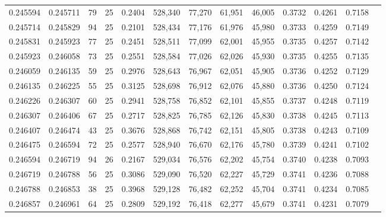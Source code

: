 \begin{tabular}{rrrrrrrrrrrrr}
0.245594 & 0.245711 &    79 &  25 &                                     0.2404 & 528,340 &  77,270 &  61,951 &  46,005 & 0.3732 & 0.4261 & 0.7158 \\
0.245714 & 0.245829 &    94 &  25 &                                     0.2101 & 528,434 &  77,176 &  61,976 &  45,980 & 0.3733 & 0.4259 & 0.7149 \\
0.245831 & 0.245923 &    77 &  25 &                                     0.2451 & 528,511 &  77,099 &  62,001 &  45,955 & 0.3735 & 0.4257 & 0.7142 \\
0.245923 & 0.246058 &    73 &  25 &                                     0.2551 & 528,584 &  77,026 &  62,026 &  45,930 & 0.3735 & 0.4255 & 0.7135 \\
0.246059 & 0.246135 &    59 &  25 &                                     0.2976 & 528,643 &  76,967 &  62,051 &  45,905 & 0.3736 & 0.4252 & 0.7129 \\
0.246135 & 0.246225 &    55 &  25 &                                     0.3125 & 528,698 &  76,912 &  62,076 &  45,880 & 0.3736 & 0.4250 & 0.7124 \\
0.246226 & 0.246307 &    60 &  25 &                                     0.2941 & 528,758 &  76,852 &  62,101 &  45,855 & 0.3737 & 0.4248 & 0.7119 \\
0.246307 & 0.246406 &    67 &  25 &                                     0.2717 & 528,825 &  76,785 &  62,126 &  45,830 & 0.3738 & 0.4245 & 0.7113 \\
0.246407 & 0.246474 &    43 &  25 &                                     0.3676 & 528,868 &  76,742 &  62,151 &  45,805 & 0.3738 & 0.4243 & 0.7109 \\
0.246475 & 0.246594 &    72 &  25 &                                     0.2577 & 528,940 &  76,670 &  62,176 &  45,780 & 0.3739 & 0.4241 & 0.7102 \\
0.246594 & 0.246719 &    94 &  26 &                                     0.2167 & 529,034 &  76,576 &  62,202 &  45,754 & 0.3740 & 0.4238 & 0.7093 \\
0.246719 & 0.246788 &    56 &  25 &                                     0.3086 & 529,090 &  76,520 &  62,227 &  45,729 & 0.3741 & 0.4236 & 0.7088 \\
0.246788 & 0.246853 &    38 &  25 &                                     0.3968 & 529,128 &  76,482 &  62,252 &  45,704 & 0.3741 & 0.4234 & 0.7085 \\
0.246857 & 0.246961 &    64 &  25 &                                     0.2809 & 529,192 &  76,418 &  62,277 &  45,679 & 0.3741 & 0.4231 & 0.7079 \\

\end{tabular}
